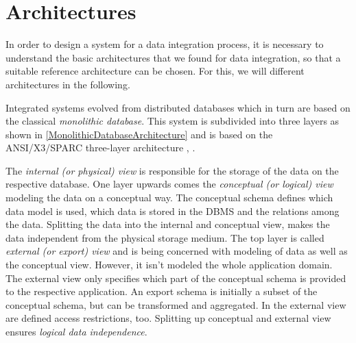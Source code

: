 \section{Architectures}

In order to design a system for a data integration process, it is necessary to understand the basic architectures that we found for data integration, so that a suitable reference architecture can be chosen. For this, we will different architectures in the following.


Integrated systems evolved from distributed databases which in turn are based on the classical \emph{monolithic database}. 
This system is subdivided into three layers as shown in \ref{MonolithicDatabaseArchitecture} and is based on the ANSI/X3/SPARC three-layer architecture \cite{TSICHRITZIS1978173}, \cite[p. 84/85]{DBLP:books/dp/LeserN2006}.

The \textit{internal (or physical) view} is responsible for the storage of the data on the respective database. 
One layer upwards comes the \textit{conceptual (or logical) view} modeling the data on a conceptual way. The conceptual schema defines which data model is used, which data is stored in the DBMS and the relations among the data.
Splitting the data into the internal and conceptual view, makes the data independent from the physical storage medium. The top layer is called \textit{external (or export) view} and is being concerned with modeling of data as well as the conceptual view. However, it isn't modeled the whole application domain. The external view only specifies which part of the conceptual schema is provided to the respective application. An export schema is initially a subset of the conceptual schema, but can be transformed and aggregated. In the external view are defined access restrictions, too. Splitting up conceptual and external view ensures \textit{logical data independence}.

